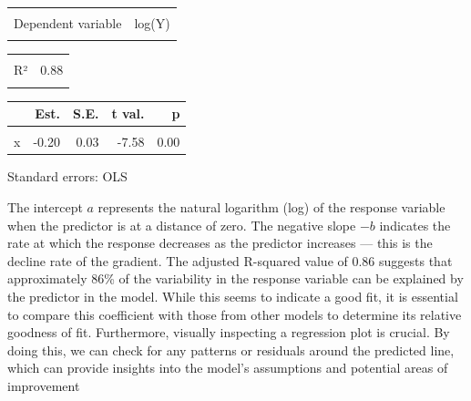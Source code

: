 \documentclass[
  letterpaper,
]{book}
\begin{document}
\begin{table}[!h]
\centering
\begin{tabular}{lr}
\toprule
\cellcolor{gray!6}{Observations} & \cellcolor{gray!6}{10}\\
Dependent variable & log(Y)\\
\cellcolor{gray!6}{Type} & \cellcolor{gray!6}{OLS linear regression}\\
\bottomrule
\end{tabular}
\end{table} \begin{table}[!h]
\centering
\begin{tabular}{lr}
\toprule
\cellcolor{gray!6}{F(1,8)} & \cellcolor{gray!6}{57.39}\\
R² & 0.88\\
\cellcolor{gray!6}{Adj. R²} & \cellcolor{gray!6}{0.86}\\
\bottomrule
\end{tabular}
\end{table} \begin{table}[!h]
\centering
\begin{threeparttable}
\begin{tabular}{lrrrr}
\toprule
  & Est. & S.E. & t val. & p\\
\midrule
\cellcolor{gray!6}{(Intercept)} & \cellcolor{gray!6}{4.58} & \cellcolor{gray!6}{0.35} & \cellcolor{gray!6}{13.00} & \cellcolor{gray!6}{0.00}\\
x & -0.20 & 0.03 & -7.58 & 0.00\\
\bottomrule
\end{tabular}
\begin{tablenotes}
\item Standard errors: OLS
\end{tablenotes}
\end{threeparttable}
\end{table}

The intercept \(a\) represents the natural logarithm (log) of the
response variable when the predictor is at a distance of zero. The
negative slope \(-b\) indicates the rate at which the response decreases
as the predictor increases --- this is the decline rate of the gradient.
The adjusted R-squared value of 0.86 suggests that approximately 86\% of
the variability in the response variable can be explained by the
predictor in the model. While this seems to indicate a good fit, it is
essential to compare this coefficient with those from other models to
determine its relative goodness of fit. Furthermore, visually inspecting
a regression plot is crucial. By doing this, we can check for any
patterns or residuals around the predicted line, which can provide
insights into the model's assumptions and potential areas of improvement
\end{document}
